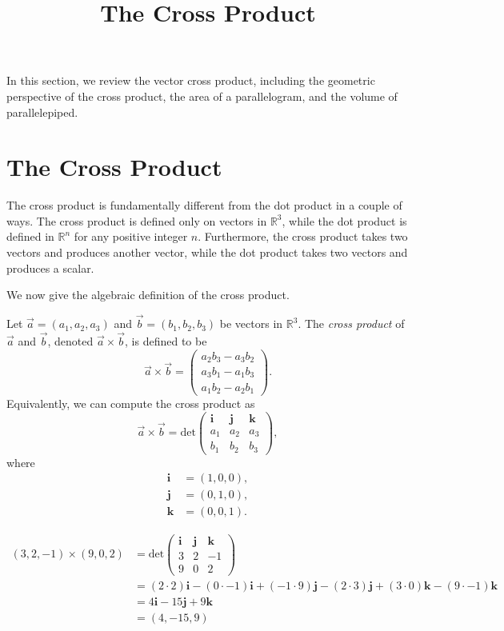 \documentclass{ximera}
\title{The Cross Product}
\begin{document}
  
\begin{abstract}  
\end{abstract}  
\maketitle 

In this section, we review the vector cross product, including the geometric perspective of the cross product, the area of a parallelogram, and the volume of parallelepiped.

\section{The Cross Product}

The cross product is fundamentally different from the dot product in a couple of ways. The cross product is defined only on vectors in $\mathbb{R}^3$, while the dot product is defined in $\mathbb{R}^n$ for any positive integer $n$. Furthermore, the cross product takes two vectors and produces another vector, while the dot product takes two vectors and produces a scalar.

We now give the algebraic definition of the cross product.

\begin{definition}
Let $\vec{a}=(a_1,a_2,a_3)$ and $\vec{b}=(b_1,b_2,b_3)$ be vectors in $\mathbb{R}^3$. The \emph{cross product} of $\vec{a}$ and $\vec{b}$, denoted $\vec{a}\times\vec{b}$, is defined to be
\[
\vec{a}\times\vec{b}=\left(\begin{array}{c}a_2b_3-a_3b_2\\a_3b_1-a_1b_3\\a_1b_2-a_2b_1\end{array}\right).
\]
Equivalently, we can compute the cross product as
\[
\vec{a}\times\vec{b}=\textrm{det}\left(\begin{array}{ccc}\mathbf{i}&\mathbf{j}&\mathbf{k}\\a_1&a_2&a_3\\b_1&b_2&b_3\end{array}\right),
\]
where
\begin{align*}
\mathbf{i}&=(1,0,0),\\
\mathbf{j}&=(0,1,0),\\
\mathbf{k}&=(0,0,1).
\end{align*}
\end{definition}

\begin{example}
\begin{align*}
(3,2,-1)\times(9,0,2) &= \textrm{det}\left(\begin{array}{ccc}\textbf{i}&\textbf{j}&\textbf{k}\\3&2&-1\\9&0&2\end{array}\right)\\
&= (2\cdot 2)\mathbf{i} - (0\cdot -1)\mathbf{i} + (-1\cdot 9)\mathbf{j} - (2\cdot 3)\mathbf{j}+(3\cdot 0)\mathbf{k} - (9\cdot -1)\mathbf{k}\\
&= 4\mathbf{i}-15\mathbf{j}+9\mathbf{k}\\
&= (4,-15, 9)
\end{align*}
\end{example}
\end{document}
